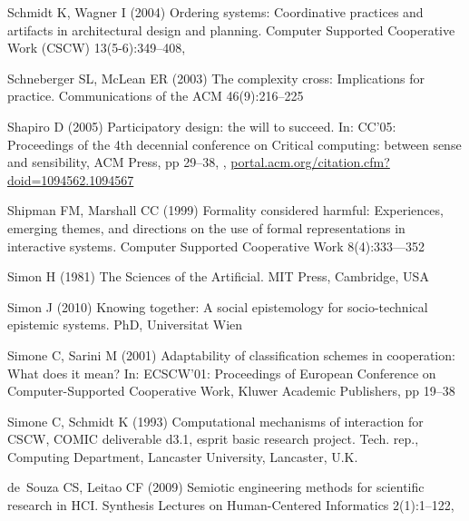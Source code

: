 \documentclass{article}
\begin{document}
\begin{thebibliography}{193}
Schmidt K, Wagner I (2004) Ordering systems: Coordinative practices and
  artifacts in architectural design and planning. Computer Supported
  Cooperative Work {(CSCW)} 13(5-6):349--408,

Schneberger SL, {McLean} ER (2003) The complexity cross: Implications for
  practice. Communications of the {ACM} 46(9):216--225

Shapiro D (2005) Participatory design: the will to succeed. In: {CC'05:}
  Proceedings of the 4th decennial conference on Critical computing: between
  sense and sensibility, {ACM} Press, pp 29--38, ,
  \urlprefix\url{portal.acm.org/citation.cfm?doid=1094562.1094567}

Shipman FM, Marshall CC (1999) Formality considered harmful: Experiences,
  emerging themes, and directions on the use of formal representations in
  interactive systems. Computer Supported Cooperative Work 8(4):333---352

Simon H (1981) The Sciences of the Artificial. {MIT} Press, Cambridge, {USA}

Simon J (2010) Knowing together: A social epistemology for socio-technical
  epistemic systems. {PhD}, Universitat Wien

Simone C, Sarini M (2001) Adaptability of classification schemes in
  cooperation: What does it mean? In: {ECSCW'01:} Proceedings of European
  Conference on Computer-Supported Cooperative Work, Kluwer Academic
  Publishers, pp 19--38

Simone C, Schmidt K (1993) Computational mechanisms of interaction for {CSCW},
  {COMIC} deliverable d3.1, esprit basic research project. Tech. rep.,
  Computing Department, Lancaster University, Lancaster, {U.K.}

de~Souza CS, Leitao CF (2009) Semiotic engineering methods for scientific
  research in {HCI}. Synthesis Lectures on Human-Centered Informatics
  2(1):1--122, 


\end{thebibliography}
\end{document}
